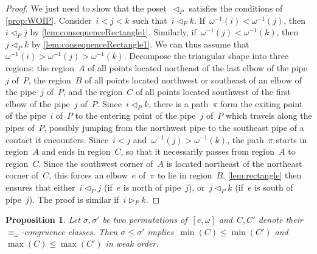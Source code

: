 \documentclass[reqno]{amsart}
\newtheorem{proposition}[theorem]{Proposition}
\theoremstyle{definition}
\newcommand{\less}{\vartriangleleft} %
\newcommand{\more}{\vartriangleright} %
\newcommand{\contactLess}[1]{\less_{#1}} %
\newcommand{\contactMore}[1]{\more_{#1}} %
\begin{document}
\begin{proof}
We just need to show that the poset~$\contactLess{P}$ satisfies the conditions of \cref{prop:WOIP}.
Consider~$i < j < k$ such that~$i \contactLess{P} k$.
If~$\omega^{-1}(i) < \omega^{-1}(j)$, then~$i \contactLess{P} j$ by \cref{lem:consequenceRectangle1}.
Similarly, if~$\omega^{-1}(j) < \omega^{-1}(k)$, then~$j \contactLess{P} k$ by \cref{lem:consequenceRectangle1}.
We can thus assume that~${\omega^{-1}(i) > \omega^{-1}(j) > \omega^{-1}(k)}$.
Decompose the triangular shape into three regions: the region~$A$ of all points located northeast of the last elbow of the pipe~$j$ of~$P$, the region~$B$ of all points located northwest or southeast of an elbow of the pipe~$j$ of~$P$, and the region~$C$ of all points located southwest of the first elbow of the pipe~$j$ of~$P$.
Since~$i \contactLess{P} k$, there is a path~$\pi$ form the exiting point of the pipe~$i$ of~$P$ to the entering point of the pipe~$j$ of~$P$ which travels along the pipes of~$P$, possibly jumping from the northwest pipe to the southeast pipe of a contact it encounters.
Since~$i < j$ and~$\omega^{-1}(j) > \omega^{-1}(k)$, the path~$\pi$ starts in region~$A$ and ends in region~$C$, so that it necessarily passes from region~$A$ to region~$C$.
Since the southwest corner of~$A$ is located northeast of the northeast corner of~$C$, this forces an elbow~$e$ of~$\pi$ to lie in region~$B$.
\cref{lem:rectangle} then ensures that either~$i \contactLess{P} j$ (if~$e$ is north of pipe~$j$), or~$j \contactLess{P} k$ (if~$e$ is south of pipe~$j$).
The proof is similar if~$i \contactMore{P} k$.
\end{proof}

\begin{proposition}
\label{prop:orderPreserving}
Let $\sigma, \sigma'$ be two permutations of~$[e, \omega]$ and~$C, C'$ denote their $\equiv_\omega$-congruence classes.
Then $\sigma \le \sigma'$ implies~$\min(C) \le \min(C')$ and $\max(C) \le \max(C')$ in weak order.
\end{proposition}
\end{document}

